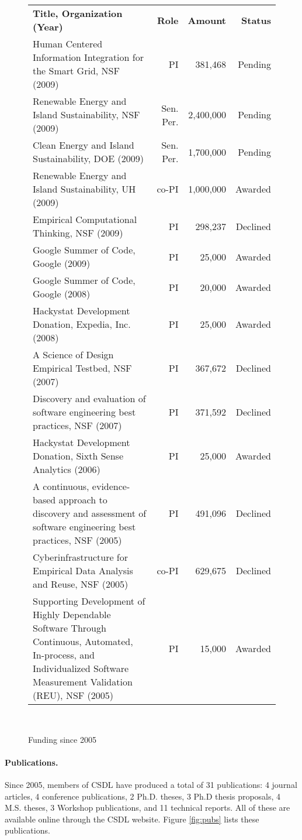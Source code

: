\documentclass[11pt]{article}
\begin{document}
\begin{figure}[ht]
\small
\begin{tabular}{p{4.5in}rrr} \hline
{\bf Title, Organization (Year)} & {\bf Role} & {\bf Amount} & {\bf Status} \\
Human Centered Information Integration for the Smart Grid, NSF (2009) & PI
& 381,468 & Pending \\
Renewable Energy and Island Sustainability, NSF (2009) & Sen. Per. & 2,400,000 & Pending \\
Clean Energy and Island Sustainability, DOE (2009) & Sen. Per. & 1,700,000 & Pending \\
Renewable Energy and Island Sustainability, UH (2009) & co-PI & 1,000,000 & Awarded  \\
Empirical Computational Thinking, NSF (2009) & PI & 298,237 & Declined \\
Google Summer of Code, Google (2009) & PI & 25,000 & Awarded \\
Google Summer of Code, Google (2008) & PI & 20,000 & Awarded \\
Hackystat Development Donation, Expedia, Inc. (2008) & PI & 25,000 & Awarded \\
A Science of Design Empirical Testbed, NSF (2007) & PI & 367,672 & Declined \\
Discovery and evaluation of software engineering best practices, NSF (2007) & PI & 371,592 & Declined \\
Hackystat Development Donation, Sixth Sense Analytics (2006) & PI & 25,000 & Awarded \\
A continuous, evidence-based approach to discovery and assessment of software engineering best practices, NSF (2005) & PI & 491,096 & Declined\\
Cyberinfrastructure for Empirical Data Analysis and Reuse, NSF (2005) & co-PI & 629,675 & Declined \\
Supporting Development of Highly Dependable Software Through Continuous, Automated, In-process, and Individualized Software Measurement Validation (REU), NSF (2005) & PI & 15,000 & Awarded \\ \hline
\end{tabular} \\ 
\normalsize
\caption{Funding since 2005}
\label{fig:funding}
\end{figure}



\paragraph{Publications.}  Since 2005, members of CSDL have produced a total of 31 publications: 4 journal articles, 4 conference publications, 2 Ph.D. theses, 3 Ph.D thesis proposals, 4 M.S. theses, 3 Workshop publications, and 11 technical reports.  All of these are available online through the CSDL website.  Figure \ref{fig:pubs} lists these publications. 
\end{document}
